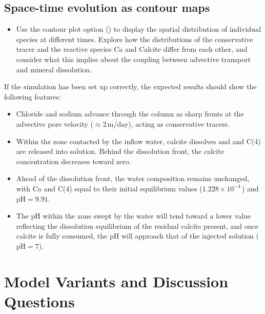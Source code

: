 \subsection{Space-time evolution as contour maps}

\begin{itemize}

\item Use the contour plot option () to display the spatial distribution
  of individual species at different times.  Explore how the
  distributions of the conservative tracer  and the reactive
  species Ca and Calcite differ from each other, and consider what this
  implies about the coupling between advective transport and mineral
  dissolution.

\end{itemize}

\noindent If the simulation has been set up correctly, the expected
results should show the following features:

\begin{itemize}

\item Chloride and sodium advance through the column as sharp fronts at
  the advective pore velocity ($\approx 2$\,m/day), acting as
  conservative tracers.

\item Within the zone contacted by the  inflow water, calcite
  dissolves and  and C(4) are released into solution.
  Behind the dissolution front, the calcite concentration decreases
  toward zero.

\item Ahead of the dissolution front, the water composition remains
  unchanged, with Ca and C(4) equal to their initial equilibrium values
  ($1.228 \times 10^{-4}$\,\molw) and $\mathrm{pH} = 9.91$.

\item The pH within the zone swept by the  water will tend
  toward a lower value reflecting the dissolution equilibrium of the
  residual calcite present, and once calcite is fully consumed, the pH
  will approach that of the injected solution ($\mathrm{pH} = 7$).

\end{itemize}

\section{Model Variants and Discussion Questions}

